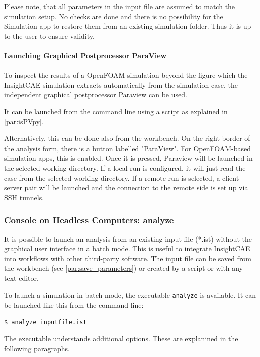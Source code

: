 Please note, that all parameters in the input file are assumed to match the simulation setup. 
No checks are done and there is no possibility for the Simulation app to restore them from an existing simulation folder.
Thus it is up to the user to ensure validity.

\paragraph{Launching Graphical Postprocessor ParaView}

To inspect the results of a OpenFOAM simulation beyond the figure which the InsightCAE simulation extracts automatically from the simulation case, the independent graphical postprocessor Paraview can be used.

It can be launched from the command line using a script as explained in \ref{par:isPVpy}.

Alternatively, this can be done also from the workbench. On the right border of the analysis form, there is a button labelled "ParaView".
For OpenFOAM-based simulation apps, this is enabled.
Once it is pressed, Paraview will be launched in the selected working directory. 
If a local run is configured, it will just read the case from the selected working directory.
If a remote run is selected, a client-server pair will be launched and the connection to the remote side is set up via SSH tunnels.



\subsubsection{Console on Headless Computers: analyze}\label{sec:analyze}

It is possible to launch an analysis from an existing input file (*.ist) without the graphical user interface in a batch mode.
This is useful to integrate InsightCAE into workflows with other third-party software.
The input file can be saved from the workbench (see \ref{par:save_parameters}) or created by a script or with any text editor.

To launch a simulation in batch mode, the executable \texttt{analyze} is available.
It can be launched like this from the command line:

\begin{lstlisting}[language=bash]
$ analyze inputfile.ist
\end{lstlisting}

The executable understands additional options.
These are explanined in the following paragraphs.

